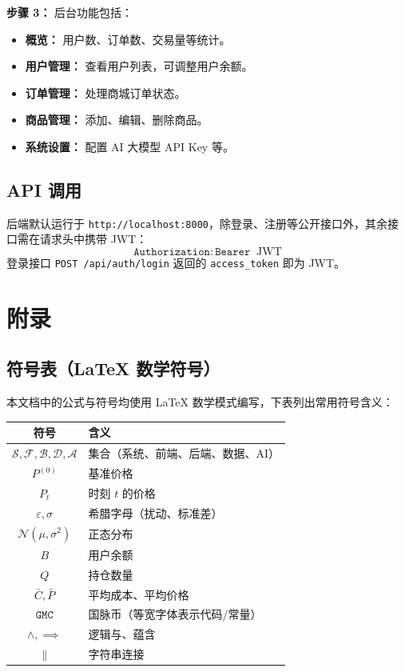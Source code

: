 \documentclass[12pt,a4paper]{article}
\begin{document}
\textbf{步骤 3：} 后台功能包括：
\begin{itemize}
\item \textbf{概览：} 用户数、订单数、交易量等统计。
\item \textbf{用户管理：} 查看用户列表，可调整用户余额。
\item \textbf{订单管理：} 处理商城订单状态。
\item \textbf{商品管理：} 添加、编辑、删除商品。
\item \textbf{系统设置：} 配置 AI 大模型 API Key 等。
\end{itemize}

\subsection{API 调用}

后端默认运行于 \texttt{http://localhost:8000}，除登录、注册等公开接口外，其余接口需在请求头中携带 JWT：
\begin{equation}
\mathtt{Authorization}: \mathtt{Bearer}\;\; \mathrm{JWT}
\end{equation}
登录接口 \texttt{POST /api/auth/login} 返回的 \texttt{access\_token} 即为 JWT。

\section{附录}

\subsection{符号表（LaTeX 数学符号）}

本文档中的公式与符号均使用 LaTeX 数学模式编写，下表列出常用符号含义：

\begin{table}[h]
\centering
\begin{tabular}{cl}
\toprule
符号 & 含义 \\
\midrule
$\mathcal{S}, \mathcal{F}, \mathcal{B}, \mathcal{D}, \mathcal{A}$ & 集合（系统、前端、后端、数据、AI） \\
$P^{(0)}$ & 基准价格 \\
$P_t$ & 时刻 $t$ 的价格 \\
$\varepsilon, \sigma$ & 希腊字母（扰动、标准差） \\
$\mathcal{N}(\mu, \sigma^2)$ & 正态分布 \\
$B$ & 用户余额 \\
$Q$ & 持仓数量 \\
$\bar{C}, \bar{P}$ & 平均成本、平均价格 \\
$\mathtt{GMC}$ & 国脉币（等宽字体表示代码/常量） \\
$\land, \implies$ & 逻辑与、蕴含 \\
$\|$ & 字符串连接 \\
\bottomrule
\end{tabular}
\end{table}
\end{document}
